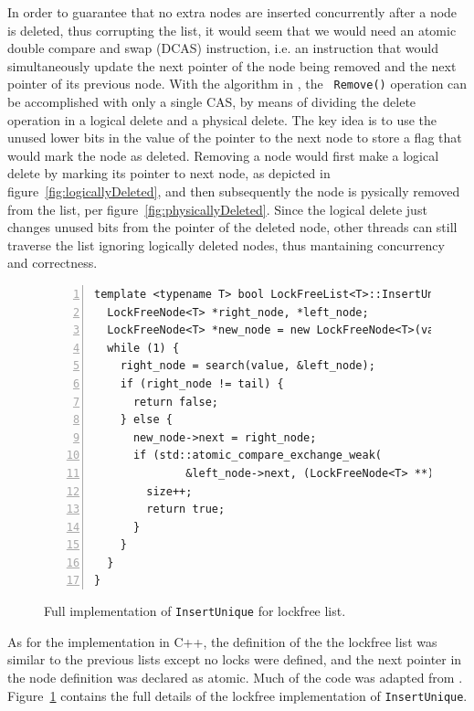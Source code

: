 \documentclass[11pt]{article}
\begin{document}
In order to guarantee that no extra nodes are inserted concurrently after a node is
deleted, thus corrupting the list, it would seem that we would need an atomic
double compare and swap (DCAS) instruction, i.e. an instruction that would
simultaneously update the next pointer of the node being removed and the next
pointer of its previous node. With the algorithm in \cite{Harris}, the {\tt
Remove()} operation can be accomplished with only a single CAS, by means of
dividing the delete operation in a logical delete and a physical delete. The key
idea is to use the unused lower bits in the value of the pointer to the next
node to store a flag that would mark the node as deleted. Removing a node would
first make a logical delete by marking its pointer to next node, as depicted in
figure~\ref{fig:logicallyDeleted}, and then subsequently the node is
pysically removed from the list, per figure~\ref{fig:physicallyDeleted}. Since
the logical delete just changes unused bits from the pointer of the deleted
node, other threads can still traverse the list ignoring logically deleted
nodes, thus mantaining concurrency and correctness.

\begin{figure}[h]
\begin{center}
\begin{lstlisting}[numbers=left]
template <typename T> bool LockFreeList<T>::InsertUnique(T value) {
  LockFreeNode<T> *right_node, *left_node;
  LockFreeNode<T> *new_node = new LockFreeNode<T>(value, nullptr, nullptr);
  while (1) {
    right_node = search(value, &left_node);
    if (right_node != tail) {
      return false;
    } else {
      new_node->next = right_node;
      if (std::atomic_compare_exchange_weak(
              &left_node->next, (LockFreeNode<T> **)&right_node, new_node)) {
        size++;
        return true;
      }
    }
  }
}
\end{lstlisting}
\caption{Full implementation of {\tt InsertUnique} for lockfree list.}
\label{fig:lockfreeIUnique}
\end{center}
\end{figure}

As for the implementation in C++, the definition of the the lockfree list was
similar to the previous  lists except no locks were defined, and the next
pointer in the node definition was  declared as atomic. Much of the code was
adapted from \cite{Harris}. Figure~\ref{fig:lockfreeIUnique}  contains the full
details of the lockfree implementation of {\tt InsertUnique}.
\end{document}
